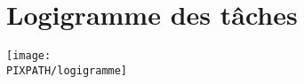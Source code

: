 \section{Logigramme des tâches}

\begin{center}

\texttt{[image: \\PIXPATH/logigramme]}

\end{center}
